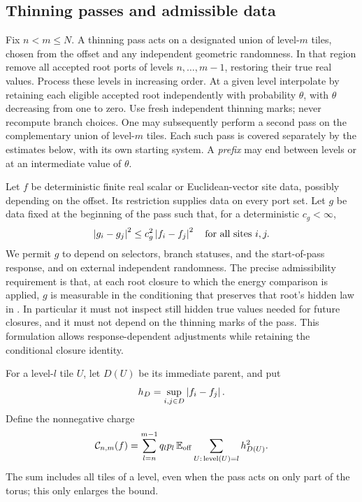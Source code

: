 \subsection{Thinning passes and admissible data}

Fix $n<m\le N$.  A thinning pass acts on a designated union of level-$m$
tiles, chosen from the offset and any independent geometric randomness.
In that region remove all accepted root ports of levels
$n,\ldots,m-1$, restoring their true real values.  Process these levels
in increasing order.  At a given level interpolate by retaining each
eligible accepted root independently with probability $\theta$, with
$\theta$ decreasing from one to zero.  Use fresh independent thinning
marks; never recompute branch choices.  One may subsequently perform a
second pass on the complementary union of level-$m$ tiles.  Each such
pass is covered separately by the estimates below, with its own
starting system.  A \emph{prefix} may end between levels or at an
intermediate value of $\theta$.

Let $f$ be deterministic finite real scalar or Euclidean-vector site
data, possibly depending on the offset.  Its restriction supplies data
on every port set.  Let $g$ be data fixed at the beginning of the pass
such that, for a deterministic $c_g<\infty$,
\begin{equation}
 \left\lvert g_i-g_j\right\rvert^2\le c_g^2\left\lvert f_i-f_j\right\rvert^2
                    \quad\text{for all sites }i,j.
 \label{hier:data-control}
\end{equation}
We permit $g$ to depend on selectors, branch statuses, and the
start-of-pass response, and on external independent randomness.  The
precise admissibility requirement is that, at each root closure to
which the energy comparison is applied, $g$ is measurable in the
conditioning that preserves that root's hidden law in
.  In particular it must not inspect still hidden
true values needed for future closures, and it must not depend on the
thinning marks of the pass.  This formulation allows response-dependent
adjustments while retaining the conditional closure identity.

For a level-$l$ tile $U$, let $D(U)$ be its immediate parent, and put
\[
 h_D=\sup_{i,j\in D}\left\lvert f_i-f_j\right\rvert.
\]
Define the nonnegative charge
\begin{equation}
 \mathcal C_{n,m}(f)
   =\sum_{l=n}^{m-1} q_lp_l\,
        \mathbb E_{\rm off}\sum_{U:\,\operatorname{level}(U)=l}
                       h_{D(U)}^2.
 \label{hier:charge-definition}
\end{equation}
The sum includes all tiles of a level, even when the pass acts on only
part of the torus; this only enlarges the bound.

